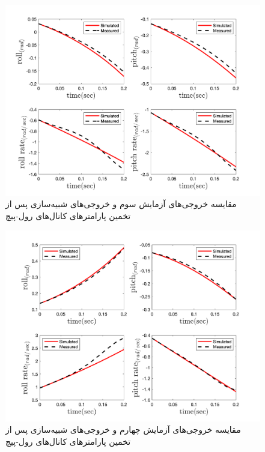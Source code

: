 \begin{figure}[H]
	\includegraphics[width=12cm]{../../Figures/RCP/roll_pitch_parameter_estimation/RCP_roll_pitch_S3.png}
	\centering
	\caption{مقايسه خروجی‌های آزمايش سوم و خروجی‌های شبیه‌سازی پس از تخمین پارامترهای کانال‌های رول-پیچ}
	\label{roll_pitch_ps3}
\end{figure}
\begin{figure}[H]
	\includegraphics[width=12cm]{../../Figures/RCP/roll_pitch_parameter_estimation/RCP_roll_pitch_S4.png}
	\centering
	\caption{مقايسه خروجی‌های آزمايش چهارم و خروجی‌های شبیه‌سازی پس از تخمین پارامترهای کانال‌های رول-پیچ}
	\label{roll_pitch_ps4}
\end{figure}
